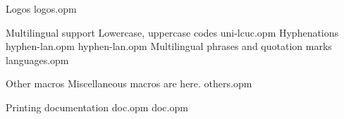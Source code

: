 \sec Logos
\printdoc logos.opm

\sec Multilingual support
\secc Lowercase, uppercase codes
\printdoctail uni-lcuc.opm
\secc Hyphenations
\printdoc     hyphen-lan.opm
\printdoctail hyphen-lan.opm
\secc[langphrases] Multilingual phrases and quotation marks
\printdoc languages.opm

\sec Other macros
Miscellaneous macros are here.
\printdoc others.opm

\sec Printing documentation
\printdoctail doc.opm
\printdoc     doc.opm

\enddocument

